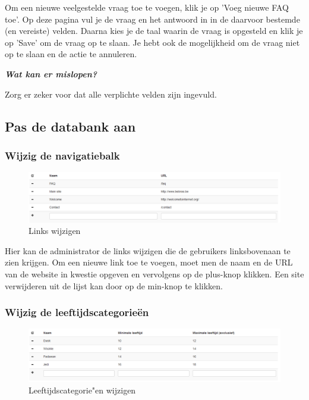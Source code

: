 \documentclass[]{article}
\begin{document}
Om een nieuwe veelgestelde vraag toe te voegen, klik je op 'Voeg nieuwe FAQ toe'. Op deze pagina vul je de vraag en het antwoord in in de daarvoor bestemde (en vereiste) velden. Daarna kies je de taal waarin de vraag is opgesteld en klik je op 'Save' om de vraag op te slaan. Je hebt ook de mogelijkheid om de vraag niet op te slaan en de actie te annuleren.

\textbf{\textit{Wat kan er mislopen?}}

Zorg er zeker voor dat alle verplichte velden zijn ingevuld.

\subsection{Pas de databank aan}

\subsubsection{Wijzig de navigatiebalk}

\begin{figure}[!ht]
	\centering
	\includegraphics[width=1\textwidth]{img/homepage_links}
	\caption{Links wijzigen}
	\label{homepage_links}
\end{figure}

Hier kan de administrator de links wijzigen die de gebruikers linksbovenaan te zien krijgen. Om een nieuwe link toe te voegen, moet men de naam en de URL van de website in kwestie opgeven en vervolgens op de plus-knop klikken. Een site verwijderen uit de lijst kan door op de min-knop te klikken.

\subsubsection{Wijzig de leeftijdscategorieën}

\begin{figure}[!ht]
	\centering
	\includegraphics[width=1\textwidth]{img/age}
	\caption{Leeftijdscategorie"en wijzigen}
	\label{age}
\end{figure}
\end{document}
